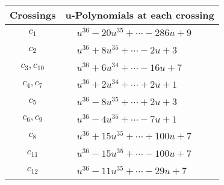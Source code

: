 \documentclass[1p]{elsarticle_modified}
\theoremstyle{definition}
\begin{document}
\begin{tabular}{m{50pt}|m{274pt}}
Crossings & \hspace{64pt}u-Polynomials at each crossing \\
\hline $$\begin{aligned}c_{1}\end{aligned}$$&$\begin{aligned}
&u^{36}-20 u^{35}+\cdots-286 u+9
\end{aligned}$\\
\hline $$\begin{aligned}c_{2}\end{aligned}$$&$\begin{aligned}
&u^{36}+8 u^{35}+\cdots-2 u+3
\end{aligned}$\\
\hline $$\begin{aligned}c_{3},c_{10}\end{aligned}$$&$\begin{aligned}
&u^{36}+6 u^{34}+\cdots-16 u+7
\end{aligned}$\\
\hline $$\begin{aligned}c_{4},c_{7}\end{aligned}$$&$\begin{aligned}
&u^{36}+2 u^{34}+\cdots+2 u+1
\end{aligned}$\\
\hline $$\begin{aligned}c_{5}\end{aligned}$$&$\begin{aligned}
&u^{36}-8 u^{35}+\cdots+2 u+3
\end{aligned}$\\
\hline $$\begin{aligned}c_{6},c_{9}\end{aligned}$$&$\begin{aligned}
&u^{36}-4 u^{35}+\cdots-7 u+1
\end{aligned}$\\
\hline $$\begin{aligned}c_{8}\end{aligned}$$&$\begin{aligned}
&u^{36}+15 u^{35}+\cdots+100 u+7
\end{aligned}$\\
\hline $$\begin{aligned}c_{11}\end{aligned}$$&$\begin{aligned}
&u^{36}-15 u^{35}+\cdots-100 u+7
\end{aligned}$\\
\hline $$\begin{aligned}c_{12}\end{aligned}$$&$\begin{aligned}
&u^{36}-11 u^{35}+\cdots-29 u+7
\end{aligned}$\\
\hline
\end{tabular}\\~\\
\end{document}
